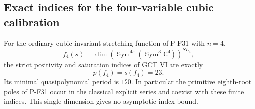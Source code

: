 \subsection{Exact indices for the four-variable cubic calibration}

\begin{proposition}
\label{prop:quaternaryindices}
For the ordinary cubic-invariant stretching function of P-F31 with
$n=4$,
\[
 f_4(s)=\dim\left(\operatorname{Sym}^{4s}
                  (\operatorname{Sym}^3\mathbb C^4)\right)^{SL_4},
\]
the strict positivity and saturation indices of GCT VI are exactly
\[
                          p(f_4)=s(f_4)=23.
 \tag{P-F35a}
\]
Its minimal quasipolynomial period is $120$. In particular the
primitive eighth-root poles of P-F31 occur in the classical
explicit series and coexist with these finite indices. This
single dimension gives no asymptotic index bound.
\end{proposition}

